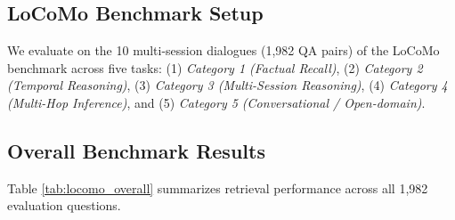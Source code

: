 \documentclass[conference]{IEEEtran}
\begin{document}
\subsection{LoCoMo Benchmark Setup}
We evaluate on the 10 multi-session dialogues (1,982 QA pairs) of the LoCoMo benchmark \cite{maharana2024evaluating} across five tasks: (1) \textit{Category 1 (Factual Recall)}, (2) \textit{Category 2 (Temporal Reasoning)}, (3) \textit{Category 3 (Multi-Session Reasoning)}, (4) \textit{Category 4 (Multi-Hop Inference)}, and (5) \textit{Category 5 (Conversational / Open-domain)}.

\subsection{Overall Benchmark Results}
Table \ref{tab:locomo_overall} summarizes retrieval performance across all 1,982 evaluation questions.


\begin{table}[t]
\centering
{}
\caption{Retrieval performance on the complete LoCoMo benchmark (1,982 questions across 10 multi-session conversations). Paired statistical significance over Dense Vector is denoted by $^* (p < 0.001)$; paired significance over BM25 is denoted by $^\dagger (p < 0.001, t=5.90)$ and $^\ddagger (p = 0.027, t=2.22)$.}
\label{tab:locomo_overall}
\end{table}
\end{document}
